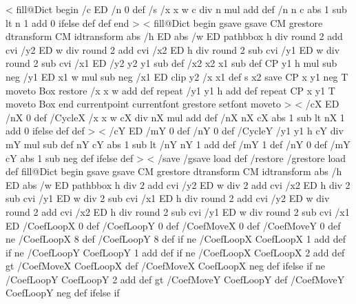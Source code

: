 \ifx\PstTiling\@undefined
  <%
    fill@Dict begin
    /c ED
    /n 0 def
    /s {
      /x x w c div n mul add def
      /n n c abs 1 sub lt { n 1 add } { 0 } ifelse def
    } def
    end
  >
<%
  fill@Dict begin
  gsave
    gsave \tx@STV CM grestore dtransform CM idtransform
    abs /h ED abs /w ED
    pathbbox
    h div round 2 add cvi /y2 ED
    w div round 2 add cvi /x2 ED
    h div round 2 sub cvi /y1 ED
    w div round 2 sub cvi /x1 ED
    /y2 y2 y1 sub def
    /x2 x2 x1 sub def
    CP
    y1 h mul sub neg /y1 ED
    x1 w mul sub neg /x1 ED
    clip
    y2 {
      /x x1 def
      s
      x2 {
        save CP x y1
        \ifx\VTeXversion\undefined
        \else
        neg
        \fi
        T moveto Box restore
        /x x w add def
      } repeat
      /y1 y1 h add def
    } repeat
    CP x y1 T moveto Box
    end
  currentpoint currentfont grestore setfont moveto
  >
\else%
  <
    /cX ED
    /nX 0 def
    /CycleX {
      /x x w cX div nX mul add def
      /nX nX cX abs 1 sub lt { nX 1 add } { 0 } ifelse def
    } def 
  >
  <%
    /cY ED
    /mY 0 def
    /nY 0 def
    /CycleY {
      /y1 y1 h cY div mY mul sub def
      nY cY abs 1 sub lt { /nY nY 1 add def /mY 1 def }
                       { /nY 0 def        /mY cY abs 1 sub neg def } ifelse
    } def
  >
  <
    \ifPSTlualatex
      /save /gsave load def
      /restore /grestore load def
      fill@Dict begin
    \fi
    gsave
    gsave \tx@STV CM grestore dtransform CM idtransform
    abs /h ED abs /w ED
    pathbbox 
  \ifPSTlualatex
    h div 2 add cvi /y2 ED
    w div 2 add cvi /x2 ED
    h div 2 sub cvi /y1 ED
    w div 2 sub cvi /x1 ED
  \else
    h div round 2 add cvi /y2 ED
    w div round 2 add cvi /x2 ED
    h div round 2 sub cvi /y1 ED
    w div round 2 sub cvi /x1 ED
  \fi
    /CoefLoopX 0 def
    /CoefLoopY 0 def
    /CoefMoveX 0 def
    /CoefMoveY 0 def
    \psk@boxfillangle{} ne {/CoefLoopX 8 def /CoefLoopY 8 def} if
    \psk@fillcyclex{} ne {/CoefLoopX CoefLoopX 1 add def} if
    \psk@fillcycley{} ne {/CoefLoopY CoefLoopY 1 add def} if
    \psk@fillmovex{} ne
      {/CoefLoopX CoefLoopX 2 add def
       \psk@fillmovex{} gt {/CoefMoveX CoefLoopX def}
                           {/CoefMoveX CoefLoopX neg def} ifelse} if
    \psk@fillmovey{} ne
      {/CoefLoopY CoefLoopY 2 add def
       \psk@fillmovey{} gt {/CoefMoveY CoefLoopY def}
                           {/CoefMoveY CoefLoopY neg def} ifelse} if
